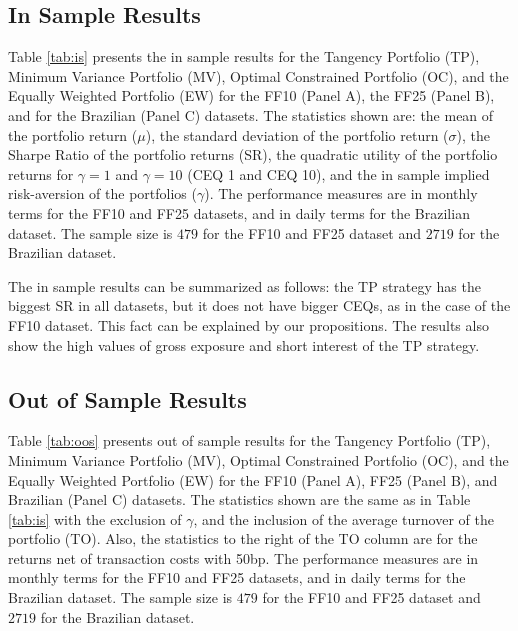 \documentclass[12pt,oneside,a4paper]{memoir}
\begin{document}
\subsection{In Sample Results}

Table \ref{tab:is} presents the in sample results for the Tangency Portfolio (TP), Minimum Variance Portfolio (MV), Optimal Constrained Portfolio (OC), and the Equally Weighted Portfolio (EW) for the FF10 (Panel A), the FF25 (Panel B), and for the Brazilian (Panel C) datasets.
The statistics shown are: the mean of the portfolio return ($\mu$), the standard deviation of the portfolio return ($\sigma$), the Sharpe Ratio of the portfolio returns (SR), the quadratic utility of the portfolio returns for $\gamma=1$ and $\gamma=10$ (CEQ 1 and CEQ 10), and the in sample implied risk-aversion of the portfolios ($\gamma$).
The performance measures are in monthly terms for the FF10 and FF25 datasets, and in daily terms for the Brazilian dataset.
The sample size is $479$ for the FF10 and FF25 dataset and $2719$ for the Brazilian dataset.

The in sample results can be summarized as follows: the TP strategy has the biggest SR in all datasets, but it does not have bigger CEQs, as in the case of the FF10 dataset.
This fact can be explained by our propositions.
The results also show the high values of gross exposure and short interest of the TP strategy.

\subsection{Out of Sample Results}

Table \ref{tab:oos} presents out of sample results for the Tangency Portfolio (TP), Minimum Variance Portfolio (MV), Optimal Constrained Portfolio (OC), and the Equally Weighted Portfolio (EW) for the FF10 (Panel A), FF25 (Panel B), and Brazilian (Panel C) datasets.
The statistics shown are the same as in Table \ref{tab:is} with the exclusion of $\gamma$, and the inclusion of the average turnover of the portfolio (TO).
Also, the statistics to the right of the TO column are for the returns net of transaction costs with 50bp.
The performance measures are in monthly terms for the FF10 and FF25 datasets, and in daily terms for the Brazilian dataset.
The sample size is $479$ for the FF10 and FF25 dataset and $2719$ for the Brazilian dataset.
\end{document}
